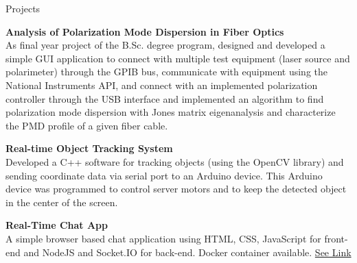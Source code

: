 \documentclass[
	11pt, %
]{./assets/resume} %
\begin{document}

\begin{rSection}{Projects}

	\textbf{Analysis of Polarization Mode Dispersion in Fiber Optics} \\
	As final year project of the B.Sc. degree program, designed and developed a simple GUI application to connect with multiple test equipment (laser source and polarimeter) through the GPIB bus, communicate with equipment using the National Instruments API, and connect with an implemented polarization controller through the USB interface and implemented an algorithm to find polarization mode dispersion with Jones matrix eigenanalysis and characterize the PMD profile of a given fiber cable.

	\textbf{Real-time Object Tracking System} \\
	Developed a C++ software for tracking objects (using the OpenCV library) and sending coordinate data via serial port to an Arduino device. This Arduino device was programmed to control server motors and to keep the detected object in the center of the screen.

	\textbf{Real-Time Chat App} \\
	A simple browser based chat application using HTML, CSS, JavaScript for front-end and NodeJS and Socket.IO for back-end. Docker container available. 
    \href{https://hub.docker.com/r/slspider/chatapp}{See Link}

\end{rSection}






\end{document}
